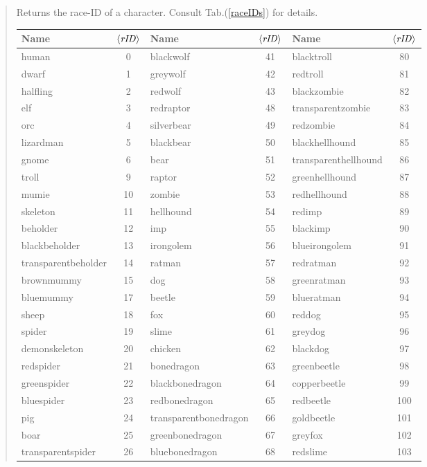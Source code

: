 \documentclass[a4paper,10pt,makeidx]{scrreprt}
\newcommand{\var}[1]{$\left\langle \text{\emph{#1}} \right\rangle$}
\begin{document}
\begin{quote}
       Returns the race-ID of a character. Consult Tab.(\ref{raceIDs}) for details.
       \begin{table}
\begin{tabular}{lc|lc|lc}
    Name & \var{rID} & Name & \var{rID} & Name & \var{rID}  \\ \hline
    human & 0 & blackwolf & 41 & blacktroll & 80\\
    dwarf & 1 & greywolf & 42 & redtroll & 81\\
    halfling & 2 & redwolf & 43 & blackzombie & 82\\
    elf & 3 & redraptor & 48 & transparentzombie & 83\\
    orc & 4 & silverbear & 49 & redzombie & 84\\
    lizardman & 5 & blackbear & 50 & blackhellhound & 85\\
    gnome & 6 & bear & 51 & transparenthellhound & 86\\
    troll & 9 & raptor & 52 & greenhellhound & 87\\
    mumie & 10 & zombie & 53 & redhellhound & 88\\
    skeleton & 11 & hellhound & 54 & redimp & 89\\
    beholder & 12 & imp & 55 & blackimp & 90\\
    blackbeholder & 13 & irongolem & 56 & blueirongolem & 91\\
    transparentbeholder & 14 & ratman & 57 & redratman & 92\\
    brownmummy & 15 & dog & 58 & greenratman & 93\\
    bluemummy & 17 & beetle & 59 & blueratman & 94\\
    sheep & 18 & fox & 60 & reddog & 95\\
    spider & 19 & slime & 61 & greydog & 96\\
    demonskeleton & 20 & chicken & 62 & blackdog & 97\\
    redspider & 21 & bonedragon & 63 & greenbeetle & 98\\
    greenspider & 22 & blackbonedragon & 64 & copperbeetle & 99\\
    bluespider & 23 & redbonedragon & 65 & redbeetle & 100\\
    pig & 24 & transparentbonedragon & 66 & goldbeetle & 101\\
    boar & 25 & greenbonedragon & 67 & greyfox & 102\\
    transparentspider & 26 & bluebonedragon & 68 & redslime & 103\\

\end{tabular}
\end{table}
\end{quote}
\end{document}
